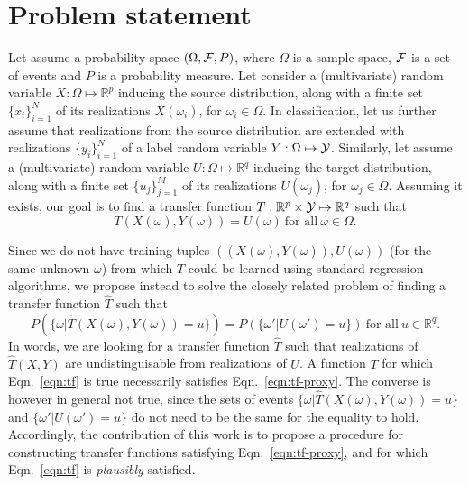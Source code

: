 \documentclass{article}
\begin{document}



\section{Problem statement}

Let assume a probability space $(\Omega, {\cal F}, P)$, where $\Omega$ is a
sample space, ${\cal F}$ is a set of events and $P$ is a probability measure.
Let consider a (multivariate) random variable $X: \Omega \mapsto
\mathbb{R}^p$ inducing the source distribution, along with a
finite set $\{x_i\}_{i=1}^N$ of its realizations $X(\omega_i)$, for $\omega_i
\in \Omega$.
In classification,
let us further assume that realizations from the source distribution are extended with realizations $\{y_i\}_{i=1}^N$
of a label random variable $Y:\Omega \mapsto {\cal Y}$.
Similarly, let assume a (multivariate) random variable $U: \Omega
\mapsto \mathbb{R}^q$ inducing the target distribution, along with a finite set
$\{u_j\}_{j=1}^M$ of its realizations $U(\omega_j)$, for $\omega_j \in \Omega$.
Assuming it exists, our goal is to find a transfer function $T: \mathbb{R}^p \times {\cal Y}
\mapsto \mathbb{R}^q$ such that
\begin{equation}\label{eqn:tf}
T(X(\omega), Y(\omega)) = U(\omega) ~\text{for all}~ \omega \in \Omega.
\end{equation}

Since we do not have training tuples $((X(\omega), Y(\omega)), U(\omega))$ (for the same
unknown $\omega$) from which $T$ could be learned using standard regression
algorithms, we propose instead to solve the closely related problem of
finding a transfer function $\hat T$ such that
\begin{equation}\label{eqn:tf-proxy}
P(\{ \omega | \hat T(X(\omega), Y(\omega)) = u \}) = P(\{ \omega' | U(\omega') = u \}) ~\text{for all}~ u \in \mathbb{R}^q.
\end{equation}
In words, we are looking for a transfer function $\hat T$ such that realizations
of $\hat T(X,Y)$ are undistinguisable from realizations of $U$. A function $T$ for
which Eqn.~\ref{eqn:tf} is true necessarily satisfies Eqn.~\ref{eqn:tf-proxy}.
The converse is however in general not true, since the sets of events $\{ \omega |
\hat T(X(\omega), Y(\omega)) = u \}$ and $\{ \omega' | U(\omega') = u \}$ do not need to be
the same for the equality to hold. Accordingly, the contribution of this work is
to propose a procedure for constructing transfer functions satisfying
Eqn.~\ref{eqn:tf-proxy}, and for which Eqn.~\ref{eqn:tf} is {\it plausibly}
satisfied.
\end{document}
